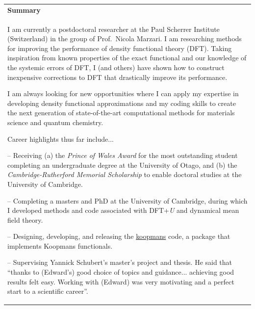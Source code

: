 \documentclass[10pt,a4paper,final]{article}
\begin{document}
\begin{tabularx}{\textwidth}{X}
   \cellcolor{seaborn_blue}\large\textbf{\textcolor{seaborn_bg_grey_half}{Summary}} \\
   I am currently a postdoctoral researcher at the Paul Scherrer Institute (Switzerland) in the group of Prof.\ Nicola Marzari. I am researching methods for improving the performance of density functional theory (DFT). Taking inspiration from known properties of the exact functional and our knowledge of the systemic errors of DFT, I (and others) have shown how to construct inexpensive corrections to DFT that drastically improve its performance.

   \vspace{6pt}
   I am always looking for new opportunities where I can apply my expertise in developing density functional approximations and my coding skills to create the next generation of state-of-the-art computational methods for materials science and quantum chemistry.
   
   \vspace{6pt}
   Career highlights thus far include...
   \vspace{6pt}

   -- Receiving (a) the \textit{Prince of Wales Award} for the most outstanding student completing an undergraduate degree at the University of Otago, and (b) the \textit{Cambridge-Rutherford Memorial Scholarship} to enable doctoral studies at the University of Cambridge.
   \vspace{6pt}

   -- Completing a masters and PhD at the University of Cambridge, during which I developed methods and code associated with DFT+\emph{U} and dynamical mean field theory.
   \vspace{6pt}

   -- Designing, developing, and releasing the \href{https://koopmans-functionals.org/}{koopmans} code, a package that implements Koopmans functionals.%
   \vspace{6pt}

   -- Supervising Yannick Schubert's master's project and thesis. He said that ``thanks to (Edward's) good choice of topics and guidance... achieving good results felt easy. Working with (Edward) was very motivating and a perfect start to a scientific career''.
   \vspace{6pt}
\end{tabularx}%
\setlength{\fboxsep}{5pt}%
\setlength{\fboxrule}{0pt}%
\end{document}
